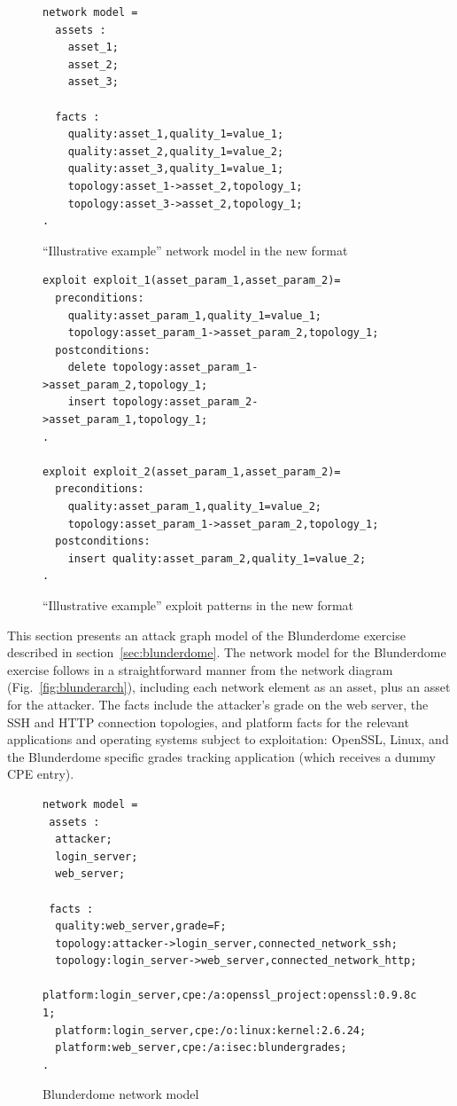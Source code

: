 \begin{figure}
\begin{lstlisting}
network model = 
  assets :
    asset_1;
    asset_2;
    asset_3;

  facts :
    quality:asset_1,quality_1=value_1;
    quality:asset_2,quality_1=value_2;
    quality:asset_3,quality_1=value_1;
    topology:asset_1->asset_2,topology_1;
    topology:asset_3->asset_2,topology_1;
.
\end{lstlisting}
\caption{``Illustrative example'' network model in the new format}
\label{fig:ill_updated_nm}
\end{figure}

\begin{figure}
\begin{lstlisting}
exploit exploit_1(asset_param_1,asset_param_2)=
  preconditions:
    quality:asset_param_1,quality_1=value_1;
    topology:asset_param_1->asset_param_2,topology_1;
  postconditions:
    delete topology:asset_param_1->asset_param_2,topology_1;
    insert topology:asset_param_2->asset_param_1,topology_1;
.

exploit exploit_2(asset_param_1,asset_param_2)=
  preconditions:
    quality:asset_param_1,quality_1=value_2;
    topology:asset_param_1->asset_param_2,topology_1;
  postconditions:
    insert quality:asset_param_2,quality_1=value_2;
.
\end{lstlisting}
\caption{``Illustrative example'' exploit patterns in the new format}
\label{fig:ill_updated_xp}
\end{figure}

This section presents an attack graph model of the Blunderdome exercise
described in section~\ref{sec:blunderdome}.
The network model for the Blunderdome exercise follows in a straightforward
manner from the network diagram (Fig.~\ref{fig:blunderarch}), including each network
element as an asset, plus an asset for the attacker. The facts include the
attacker's grade on the web server, the SSH and HTTP connection topologies,
and platform facts for the relevant applications and operating systems subject
to exploitation: OpenSSL, Linux, and the Blunderdome specific grades tracking
application (which receives a dummy CPE entry).

\begin{figure}
\begin{lstlisting}
network model = 
 assets :
  attacker;
  login_server;
  web_server;
    
 facts :
  quality:web_server,grade=F;
  topology:attacker->login_server,connected_network_ssh;
  topology:login_server->web_server,connected_network_http;
  platform:login_server,cpe:/a:openssl_project:openssl:0.9.8c-1;
  platform:login_server,cpe:/o:linux:kernel:2.6.24;
  platform:web_server,cpe:/a:isec:blundergrades;
.
\end{lstlisting}
\caption{Blunderdome network model}
\label{fig:blunder_nm}
\end{figure}

